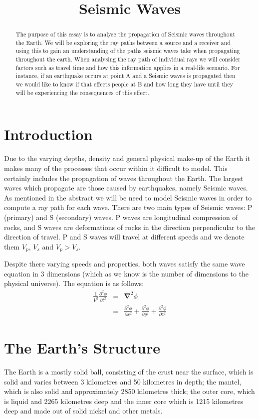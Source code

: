 \documentclass{mm2}
\title{Seismic Waves}
\newcommand{\bnabla}{\boldsymbol{\nabla}}
\begin{document}
\begin{abstract}
The purpose of this essay is to analyse the propagation of Seismic waves throughout the Earth. We will be exploring the ray paths between a source and a receiver and using this to gain an understanding of the paths seismic waves take when propagating throughout the earth. When analysing the ray path of individual rays we will consider factors such as travel time and how this information applies in a real-life scenario. For instance, if an earthquake occurs at point A and a Seismic waves is propagated then we would like to know if that effects people at B and how long they have until they will be experiencing the consequences of this effect.
\end{abstract}



\section{Introduction}
Due to the varying depths, density and general physical make-up of the Earth it makes many of the processes that occur within it difficult to model. This certainly includes the propagation of waves throughout the Earth. The largest waves which propagate are those caused by earthquakes, namely Seismic waves. As mentioned in the abstract we will be need to model Seismic waves in order to compute a ray path for each wave. There are two main types of Seismic waves: P (primary) and S (secondary) waves. P waves are longitudinal compression of rocks, and S waves are deformations of rocks in the direction perpendicular to the direction of travel. P and S waves will travel at different speeds and we denote them $V_p$, $V_s$ and $V_p > V_s$. 

Despite there varying speeds and properties, both waves satisfy the same wave equation in 3 dimensions (which as we know is the number of dimensions to the physical universe). The equation is as follows:
\begin{eqnarray}
\frac{1}{V^2}\frac{\partial^2 \phi}{\partial t^2}&=&\bnabla^2\phi\nonumber\\
&=&\frac{\partial^2 \phi}{\partial x^2}+\frac{\partial^2 \phi}{\partial y^2}+
\frac{\partial^2 \phi}{\partial z^2}
\label{eq_wave}
\end{eqnarray}
\section{The Earth's Structure}
The Earth is a mostly solid ball, consisting of the crust near the surface, which is solid and varies between 3 kilometres and 50 kilometres in depth; the mantel, which is also solid and approximately 2850 kilometres thick; the outer core, which is liquid and 2265 kilometres deep and the inner core which is 1215 kilometres deep and made out of solid nickel and other metals.
\end{document}
